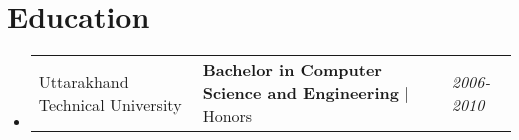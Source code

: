 \documentclass[letterpaper,10pt]{article}
\makeatletter
\newcommand{\subheadingtitlevspace}{
\vspace{-3pt}
}
\newcommand{\titleItem}[1]{
  \textbf{#1}
}
\newcommand{\resumeSubheading}[4]{
  \item
     \begin{tabular*}{0.97\textwidth}[t]{l@{\extracolsep{\fill}}l@{}l}     
      {#1} & \titleItem{#3} | {#2} & \textit{#4}\\
    \end{tabular*}\vspace{-10pt}
}
\newcommand{\resumeSubHeadingListStart}{\subheadingtitlevspace\begin{itemize}[leftmargin=0.15in, label={}]}
\newcommand{\resumeSubHeadingListEnd}{\end{itemize}}
\makeatother
\begin{document}

\section{Education}
  \resumeSubHeadingListStart 
    \resumeSubheading
      {Uttarakhand Technical University}{Honors}
      {Bachelor in Computer Science and Engineering}{2006-2010}
  \resumeSubHeadingListEnd
\vspace{-8pt}
\end{document}
